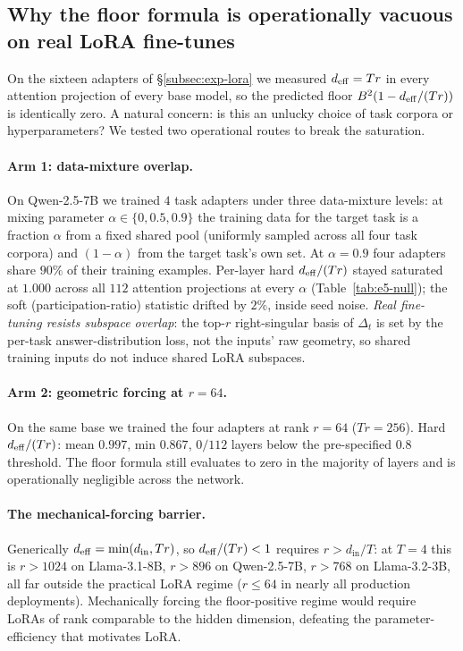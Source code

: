 \subsection{Why the floor formula is operationally vacuous on real
LoRA fine-tunes}
\label{subsec:exp-e5-null}

On the sixteen adapters of \S\ref{subsec:exp-lora} we measured
$d_{\mathrm{eff}} = Tr$ in every attention projection of every base model, so the
predicted floor $B^2(1 - d_{\mathrm{eff}}/(Tr))$ is identically zero. A natural
concern: is this an unlucky choice of task corpora or hyperparameters?
We tested two operational routes to break the saturation.

\paragraph{Arm 1: data-mixture overlap.} On Qwen-2.5-7B we trained $4$
task adapters under three data-mixture levels: at mixing parameter
$\alpha \in \{0, 0.5, 0.9\}$ the training data for the target task is a
fraction $\alpha$ from a fixed shared pool (uniformly sampled across
all four task corpora) and $(1-\alpha)$ from the target task's own set.
At $\alpha = 0.9$ four adapters share $90\%$ of their training
examples. Per-layer hard $d_{\mathrm{eff}}/(Tr)$ stayed saturated at $1.000$
across all $112$ attention projections at every $\alpha$
(Table~\ref{tab:e5-null}); the soft (participation-ratio) statistic
drifted by $2\%$, inside seed noise. \emph{Real fine-tuning resists
subspace overlap}: the top-$r$ right-singular basis of $\Delta_t$ is
set by the per-task answer-distribution loss, not the inputs' raw
geometry, so shared training inputs do not induce shared LoRA
subspaces.

\paragraph{Arm 2: geometric forcing at $r = 64$.} On the same base we
trained the four adapters at rank $r = 64$ ($Tr = 256$). Hard
$d_{\mathrm{eff}}/(Tr)$: mean $0.997$, min $0.867$, $0/112$ layers below the
pre-specified $0.8$ threshold. The floor formula still evaluates to
zero in the majority of layers and is operationally negligible across
the network.

\paragraph{The mechanical-forcing barrier.} Generically
$d_{\mathrm{eff}} = \min(d_{\mathrm{in}}, Tr)$, so $d_{\mathrm{eff}}/(Tr) < 1$ requires
$r > d_{\mathrm{in}}/T$: at $T = 4$ this is $r > 1024$ on
Llama-3.1-8B, $r > 896$ on Qwen-2.5-7B, $r > 768$ on Llama-3.2-3B,
all far outside the practical LoRA regime ($r \leq 64$ in nearly all
production deployments). Mechanically forcing the floor-positive
regime would require LoRAs of rank comparable to the hidden dimension,
defeating the parameter-efficiency that motivates LoRA.

